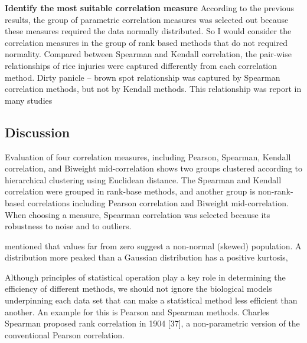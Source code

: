 \textbf{Identify the most suitable correlation measure}
According to the previous results, the group of parametric correlation measures was selected out because these measures required the data normally distributed. So I would consider the correlation measures in the group of rank based methods that do not required normality. Compared between Spearman and Kendall correlation, the pair-wise relationships of rice injuries were captured differently from each correlation method. Dirty panicle – brown spot relationship was captured by Spearman correlation methods, but not by Kendall methods. This relationship was report in many studies \citep{Ou_1985_Rice,Barnwal_2013_Review}


\subsection{Discussion}
Evaluation of four correlation measures, including Pearson, Spearman, Kendall correlation, and Biweight mid-correlation shows two groups clustered according to hierarchical clustering using Euclidean distance. The Spearman and Kendall correlation were grouped in rank-base methods, and another group is non-rank-based correlations including Pearson correlation and Biweight mid-correlation. When choosing a measure, Spearman correlation was selected because its robustness to noise and to outliers.

\citet{Doane_2011_Measuring} mentioned that values far from zero suggest a non-normal (skewed) population.
A distribution more peaked than a Gaussian distribution has a positive kurtosis, 


Although principles of statistical operation play a key role in determining the efficiency of different methods, we should not ignore the biological models underpinning each data set that can make a statistical method less efficient than another. An example for this is Pearson and Spearman methods. Charles Spearman proposed rank correlation in 1904 [37], a non-parametric version of the conventional Pearson correlation. 

